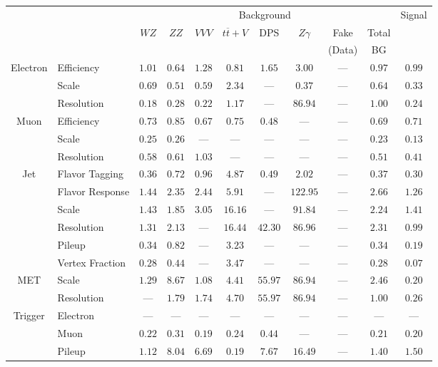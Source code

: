 \small\renewcommand{\tabcolsep}{4pt}
\begin{tabular}{|cl||ccccccc|c||c|}
\hline
 & & \multicolumn{8}{c||}{Background} & Signal \\ 
 & & $WZ$ & $ZZ$ & $VVV$ & $t\overline{t}+V$ & DPS & $Z\gamma$ & Fake & Total & \\ 
 & & &  &  &  &  &  & (Data) & BG & \\ 
\hline\hline
\multirow{3}{*}{Electron}
& Efficiency  & $ 1.01$  & $ 0.64$  & $ 1.28$  & $ 0.81$  & $ 1.65$  & $ 3.00$  & ---  & $ 0.97$  & $ 0.99$ \\ 
\cline{2-11}
& Scale  & $ 0.69$  & $ 0.51$  & $ 0.59$  & $ 2.34$  & ---  & $ 0.37$  & ---  & $ 0.64$  & $ 0.33$ \\ 
\cline{2-11}
& Resolution & $0.18$& $0.28$& $0.22$& $1.17$&  --- & $86.94$&  --- & $1.00$& $0.24$\\ 
\hline
\multirow{3}{*}{Muon}
& Efficiency & $0.73$& $0.85$& $0.67$& $0.75$& $0.48$&  --- &  --- & $0.69$& $0.71$\\ 
\cline{2-11}
& Scale & $0.25$& $0.26$&  --- &  --- &  --- &  --- &  --- & $0.23$& $0.13$\\ 
\cline{2-11}
& Resolution  & $ 0.58$  & $ 0.61$  & $ 1.03$  & ---  & ---  & ---  & ---  & $ 0.51$  & $ 0.41$ \\ 
\hline
\multirow{6}{*}{Jet}
& Flavor Tagging  & $ 0.36$  & $ 0.72$  & $ 0.96$  & $ 4.87$  & $ 0.49$  & $ 2.02$  & ---  & $ 0.37$  & $ 0.30$ \\ 
\cline{2-11}
& Flavor Response  & $ 1.44$  & $ 2.35$  & $ 2.44$  & $ 5.91$  & ---  & $ 122.95$  & ---  & $ 2.66$  & $ 1.26$ \\ 
\cline{2-11}
& Scale  & $ 1.43$  & $ 1.85$  & $ 3.05$  & $ 16.16$  & ---  & $ 91.84$  & ---  & $ 2.24$  & $ 1.41$ \\ 
\cline{2-11}
& Resolution & $1.31$& $2.13$&  --- & $16.44$& $42.30$& $86.96$&  --- & $2.31$& $0.99$\\ 
\cline{2-11}
& Pileup  & $ 0.34$  & $ 0.82$  & ---  & $ 3.23$  & ---  & ---  & ---  & $ 0.34$  & $ 0.19$ \\ 
\cline{2-11}
& Vertex Fraction & $0.28$& $0.44$&  --- & $3.47$&  --- &  --- &  --- & $0.28$& $0.07$\\ 
\hline
\multirow{2}{*}{MET}
& Scale & $1.29$& $8.67$& $1.08$& $4.41$& $55.97$& $86.94$&  --- & $2.46$& $0.20$\\ 
\cline{2-11}
& Resolution &  --- & $1.79$& $1.74$& $4.70$& $55.97$& $86.94$&  --- & $1.00$& $0.26$\\ 
\hline
\multirow{2}{*}{Trigger}
& Electron & --- & --- & --- & --- & --- & --- & --- & --- & ---\\ 
\cline{2-11}
& Muon & $0.22$& $0.31$& $0.19$& $0.24$& $0.44$&  --- &  --- & $0.21$& $0.20$\\ 
\hline
& Pileup & $1.12$& $8.04$& $6.69$& $0.19$& $7.67$& $16.49$&  --- & $1.40$& $1.50$\\ 
\hline
\end{tabular}
